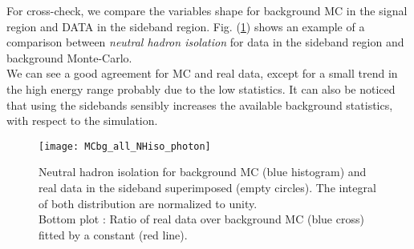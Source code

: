 For cross-check, we compare the variables shape for background MC in the signal region and DATA in the sideband region.
Fig. (\ref{MCbg_all_NHiso_photon}) shows an example of a comparison between \emph{neutral hadron isolation} for data in
the sideband region and background Monte-Carlo.\\
We can see a good agreement for MC and real data, except for a small trend in the high energy range probably due to the low statistics.
It can also be noticed that using the sidebands sensibly increases the available background statistics, with respect to
the simulation.
\begin{figure}[h!]
  \centering
  \texttt{[image: MCbg\_all\_NHiso\_photon]}\\[1cm]
  \caption{Neutral hadron isolation for background MC (blue histogram) and real data in the sideband superimposed (empty circles). The integral of both distribution are normalized to unity.\\Bottom plot : Ratio of real data over background MC (blue cross) fitted by a constant (red line).}
  \label{MCbg_all_NHiso_photon}
\end{figure}

